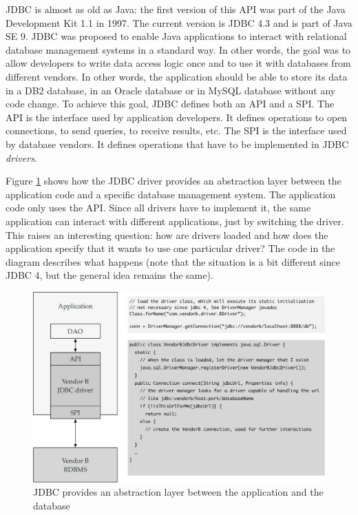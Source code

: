 \ac{JDBC} is almost as old as Java: the first version of this API was part of the Java Development Kit 1.1 in 1997. The current version is JDBC 4.3 and is part of Java SE 9. \ac{JDBC} was proposed to enable Java applications to interact with relational database management systems in a standard way. In other words, the goal was to allow developers to write data access logic once and to use it with databases from different vendors. In other words, the application should be able to store its data in a DB2 database, in an Oracle database or in MySQL database without any code change. To achieve this goal, \ac{JDBC} defines both an \ac{API} and a \ac{SPI}. The \ac{API} is the interface used by application developers. It defines operations to open connections, to send queries, to receive results, etc. The \ac{SPI} is the interface used by database vendors. It defines operations that have to be implemented in \ac{JDBC} \emph{drivers}.


Figure \ref{fig:jdbcDriver} shows how the \ac{JDBC} driver provides an abstraction layer between the application code and a specific database management system. The application code only uses the \ac{API}. Since all drivers have to implement it, the same application can interact with different applications, just by switching the driver. This raises an interesting question: how are drivers loaded and how does the application specify that it wants to use one particular driver? The code in the diagram describes what happens (note that the situation is a bit different since \ac{JDBC} 4, but the general idea remains the same).

\begin{figure}[]
	\centering
    \includegraphics[width=1.0\linewidth]{Figures/jdbc-driver.pdf}
	\caption{JDBC provides an abstraction layer between the application and the database}
  \label{fig:jdbcDriver}
\end{figure}


